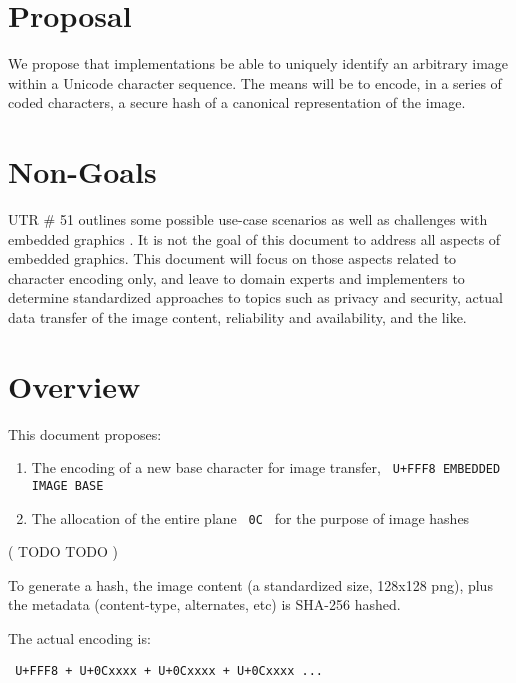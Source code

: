 \documentclass[12pt]{article}
\begin{document}
\section{Proposal}

We propose that implementations be able to uniquely identify an
arbitrary image within a Unicode character sequence. The means will be
to encode, in a series of coded characters, a secure hash of a
canonical representation of the image.



\section{Non-Goals}

UTR \# 51 outlines some possible use-case scenarios as well as challenges with embedded graphics \autocite[Section 8, ``Longer Term Solutions'']{UTR51}. It is not the goal of this document to
address all aspects of embedded graphics. This document will focus on those aspects related to character
encoding only, and leave to domain experts and implementers to determine standardized
approaches to topics such as privacy and security, actual data transfer of the image content,
reliability and availability, and the like.


\section{Overview}

This document proposes:

\begin{enumerate}

\item The encoding of a new base character for image transfer, 
  \texttt{ U+FFF8 EMBEDDED IMAGE BASE }
  
\item The allocation of the entire plane \texttt{ 0C } for the purpose of image hashes

\end{enumerate}

( TODO TODO )

To generate a hash, the image content (a standardized size, 128x128 png),
plus the metadata (content-type, alternates, etc) is SHA-256 hashed.

The actual encoding is:


\texttt { U+FFF8 + U+0Cxxxx + U+0Cxxxx + U+0Cxxxx ... }
\end{document}
